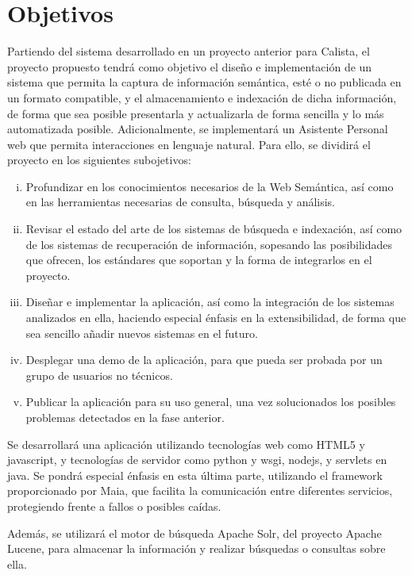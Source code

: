 \documentclass[a4paper,11pt]{report}
\begin{document}
\chapter*{Objetivos}\vspace{-1ex}

Partiendo del sistema desarrollado en un proyecto anterior para Calista\cite{jherrera13}, el proyecto propuesto tendrá como objetivo el diseño e implementación de un sistema que permita la captura de información semántica, esté o no publicada en un formato compatible, y el almacenamiento e indexación de dicha información, de forma que sea posible presentarla y actualizarla de forma sencilla y lo más automatizada posible. Adicionalmente, se implementará un Asistente Personal web que permita interacciones en lenguaje natural.
Para ello, se dividirá el proyecto en los siguientes subojetivos:

\begin{enumerate}[i.]
  \item Profundizar en los conocimientos necesarios de la Web Semántica, así como en las herramientas necesarias de consulta, búsqueda y análisis.
  \item Revisar el estado del arte de los sistemas de búsqueda e indexación, así como de los sistemas de recuperación de información, sopesando las posibilidades que ofrecen, los estándares que soportan y la forma de integrarlos en el proyecto.
  \item Diseñar e implementar la aplicación, así como la integración de los sistemas analizados en ella, haciendo especial énfasis en la extensibilidad, de forma que sea sencillo añadir nuevos sistemas en el futuro.
  \item Desplegar una demo de la aplicación, para que pueda ser probada por un grupo de usuarios no técnicos.
  \item Publicar la aplicación para su uso general, una vez solucionados los posibles problemas detectados en la fase anterior.
\end{enumerate}


Se desarrollará una aplicación utilizando tecnologías web como HTML5 y javascript, y tecnologías de servidor como python y wsgi, nodejs, y servlets en java. Se pondrá especial énfasis en esta última parte, utilizando el framework proporcionado por Maia\cite{maia14}, que facilita la comunicación entre diferentes servicios, protegiendo frente a fallos o posibles caídas.

Además, se utilizará el motor de búsqueda Apache Solr\cite{solr}, del proyecto Apache Lucene\cite{lucene}, para almacenar la información y realizar búsquedas o consultas sobre ella.
\end{document}
